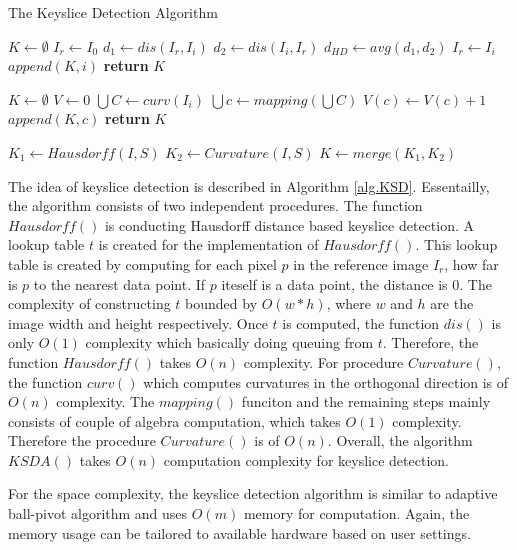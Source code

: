 \begin{algorithm}
\caption{The Keyslice Detection Algorithm}
\label{alg.KSD}
\begin{algorithmic}[1]
  \State $K \leftarrow \emptyset$  
  \State $I_r \leftarrow I_0$
    \State $d_1 \leftarrow dis(I_r, I_i) $
    \State $d_2 \leftarrow dis(I_i, I_r) $
    \State $d_{HD} \leftarrow avg(d_1, d_2) $ 
       \State $I_r \leftarrow I_i$  
       \State $ append(K, i) $
    \EndIf
  \EndFor
  \State \textbf{return} $K$
\EndProcedure

  \State $K \leftarrow \emptyset$  
  \State $V \leftarrow 0$ 
     \State $\bigcup{C} \leftarrow curv(I_i)$ 
     \State $\bigcup{c} \leftarrow mapping(\bigcup{C}) $ 
        \State $V(c) \leftarrow V(c) + 1$ 
     \EndFor
  \EndFor
       
	\State $append(K, c)$
     \EndIf
  \EndFor
  \State \textbf{return} $K$
\EndProcedure

\State $K_1 \leftarrow Hausdorff(I, S)$ 
\State $K_2 \leftarrow Curvature(I, S)$ 
\State $K \leftarrow merge(K_1, K_2)$
\EndProcedure
\end{algorithmic}
\end{algorithm}

The idea of keyslice detection is described in Algorithm \ref{alg.KSD}. 
Essentailly, the algorithm consists of two independent procedures. 
The function $Hausdorff()$ is conducting Hausdorff distance based keyslice
detection. A lookup table $t$ is created for the implementation of $Hausdorff()$. 
This lookup table is created by computing for each pixel $p$ in the reference image $I_r$,
how far is $p$ to the nearest data point. If $p$ iteself is a data point, the distance is 0.
The complexity of constructing $t$ bounded by $O(w*h)$, where $w$ and $h$ are the image
width and height respectively. Once $t$ is computed, the function $dis()$ is only
$O(1)$ complexity which basically doing queuing from $t$. Therefore, the function $Hausdorff()$
takes $O(n)$ complexity. 
For procedure $Curvature()$, the function $curv()$ which computes curvatures
in the orthogonal direction is of $O(n)$ complexity. The $mapping()$ funciton and
the remaining steps mainly consists of couple of algebra computation, which takes $O(1)$ complexity. 
Therefore the procedure $Curvature()$ is of $O(n)$. Overall, the algorithm $KSDA()$ takes
$O(n)$ computation complexity for keyslice detection. 

For the space complexity, the keyslice detection algorithm is similar to adaptive ball-pivot
algorithm and uses $O(m)$ memory for computation. Again, the memory usage can be tailored to 
available hardware based on user settings.


